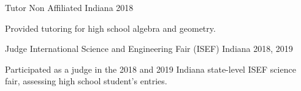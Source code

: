 


\begin{cventries}


\cventry
{Tutor} %
{Non Affiliated} %
{Indiana} %
{2018} %
{ %
\begin{cvitems}
\item {Provided tutoring for high school algebra and geometry.}
\end{cvitems}
}

\cventry
{Judge} %
{International Science and  Engineering Fair (ISEF)} %
{Indiana} %
{2018, 2019} %
{ %
\begin{cvitems}
\item {Participated as a judge in the 2018 and 2019 Indiana state-level ISEF science fair, assessing high school student's entries.}
\end{cvitems}
}

\end{cventries}

